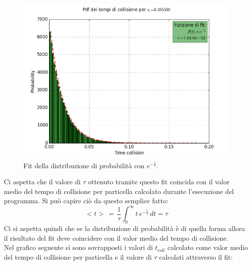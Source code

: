 \begin{center}
	\begin{figure}[h!]
	\centering
		\includegraphics[scale=0.5]{sfere2D/fit_pdf_tc.png}
		\caption{Fit della distribuzione di probabilità con $e^{-\frac{t}{\tau}}$.}
	\end{figure}
\end{center}
Ci aspetta che il valore di $\tau$ ottenuto tramite questo fit coincida con il valor medio del tempo di collisione per particella calcolato durante l'esecuzione del programma. Si può capire ciò da questo semplice fatto:
$$
	<t> \, = \, \frac{1}{\tau}\int_0^{\infty} t \, e^{-\frac{t}{\tau}}\,dt = \tau
$$
Ci si aspetta quindi che se la distribuzione di probabilità è di quella forma allora il risultato del fit deve coincidere con il valor medio del tempo di collisione.\\
Nel grafico seguente si sono sovrapposti i valori di $t_{coll}$ calcolato come valor medio del tempo di collisione per particella e il valore di $\tau$ calcolati attraverso il fit:
